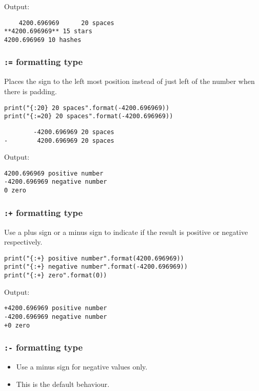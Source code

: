 \documentclass[11pt]{article}
\begin{document}
 \noindent Output:

\label{org8b78767}
\begin{verbatim}
    4200.696969      20 spaces
**4200.696969** 15 stars
4200.696969 10 hashes
\end{verbatim}
\subsubsection{\texttt{:=} formatting type}
\label{sec:org8d2bafe}
Places the sign to the left most position instead of just left of the number when there is padding.

\begin{verbatim}
print("{:20} 20 spaces".format(-4200.696969))
print("{:=20} 20 spaces".format(-4200.696969))
\end{verbatim}

\label{orgc22fcc3}
\begin{verbatim}
        -4200.696969 20 spaces
-        4200.696969 20 spaces
\end{verbatim}


 \noindent Output:

\label{orgb30eebb}
\begin{verbatim}
4200.696969 positive number
-4200.696969 negative number
0 zero
\end{verbatim}
\subsubsection{\texttt{:+} formatting type}
\label{sec:org9b53eda}
Use a plus sign or a minus sign to indicate if the result is positive or negative respectively.

\begin{verbatim}
print("{:+} positive number".format(4200.696969))
print("{:+} negative number".format(-4200.696969))
print("{:+} zero".format(0))
\end{verbatim}

 \noindent Output:

\label{org0d3ce7d}
\begin{verbatim}
+4200.696969 positive number
-4200.696969 negative number
+0 zero
\end{verbatim}
\subsubsection{\texttt{:-} formatting type}
\label{sec:org5198743}
\begin{itemize}
\item Use a minus sign for negative values only.
\item This is the default behaviour.
\end{itemize}
\end{document}
